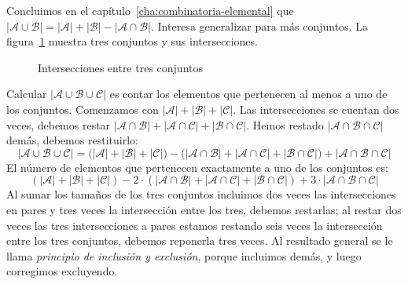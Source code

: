   Concluimos en el capítulo~\ref{cha:combinatoria-elemental}
  que
  \(\lvert \mathcal{A} \cup \mathcal{B} \rvert
      = \lvert \mathcal{A} \rvert
	   + \lvert \mathcal{B} \rvert
	   - \lvert \mathcal{A} \cap \mathcal{B} \rvert
  \).
  Interesa generalizar para más conjuntos.
  La figura~\ref{fig:PIE} muestra tres conjuntos
  y sus intersecciones.
  \begin{figure}[htbp]
    \centering
    \caption{Intersecciones entre tres conjuntos}
    \label{fig:PIE}
  \end{figure}
  Calcular
    \(\lvert \mathcal{A} \cup \mathcal{B} \cup \mathcal{C} \rvert\)
  es contar los elementos
  que pertenecen al menos a uno de los conjuntos.
  Comenzamos con \(\lvert \mathcal{A} \rvert
		     + \lvert \mathcal{B} \rvert
		     + \lvert \mathcal{C} \rvert\).
  Las intersecciones se cuentan dos veces,
  debemos restar
  \(\lvert \mathcal{A} \cap \mathcal{B} \rvert
      + \lvert \mathcal{A} \cap \mathcal{C} \rvert
      + \lvert \mathcal{B} \cap \mathcal{C} \rvert\).
  Hemos restado
    \(\lvert \mathcal{A}
	\cap \mathcal{B}
	\cap \mathcal{C} \rvert\) demás,
  debemos restituirlo:
  \begin{equation*}
    \lvert \mathcal{A} \cup \mathcal{B} \cup \mathcal{C} \rvert
      = \bigl(
	  \lvert \mathcal{A} \rvert
	     + \lvert \mathcal{B} \rvert
	     + \lvert \mathcal{C} \rvert
	 \bigr)
	   - \bigl(
	       \lvert \mathcal{A} \cap \mathcal{B} \rvert
		  + \lvert \mathcal{A} \cap \mathcal{C} \rvert
		  + \lvert \mathcal{B} \cap \mathcal{C} \rvert
	     \bigr)
	   + \lvert
	       \mathcal{A} \cap \mathcal{B} \cap \mathcal{C}
	     \rvert
  \end{equation*}
  El número de elementos
  que pertenecen exactamente a uno de los conjuntos es:
  \begin{equation*}
    \left(
      \lvert \mathcal{A} \rvert
	+ \lvert \mathcal{B} \rvert
	+ \lvert \mathcal{C} \rvert
    \right)
      - 2 \cdot \left(
	    \lvert \mathcal{A} \cap \mathcal{B} \rvert
	       + \lvert \mathcal{A} \cap \mathcal{C} \rvert
	       + \lvert \mathcal{B} \cap \mathcal{C} \rvert
	  \right)
      + 3 \cdot \lvert
		  \mathcal{A} \cap \mathcal{B} \cap \mathcal{C}
		\rvert
  \end{equation*}
  Al sumar los tamaños de los tres conjuntos
  incluimos dos veces las intersecciones en pares
  y tres veces la intersección entre los tres,
  debemos restarlas;
  al restar dos veces las tres intersecciones a pares
  estamos restando seis veces
  la intersección entre los tres conjuntos,
  debemos reponerla tres veces.
  Al resultado general
  se le llama \emph{principio de inclusión y exclusión},
  porque incluimos demás,
  y luego corregimos excluyendo.

